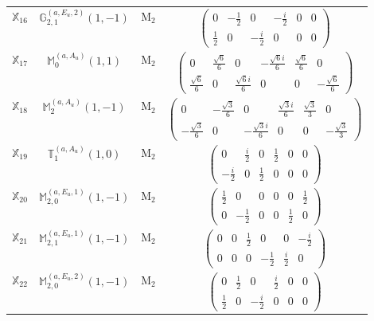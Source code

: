 \documentclass[fleqn,10pt,landscape]{article}
\begin{document}
\begin{itemize}
\begin{center}
\begin{longtable}{c|c|c|c}
$ \mathbb{X}_{16} $ & $\mathbb{G}_{2,1}^{(a,E_{u},2)}(1,-1)$ & M$_{2}$ & $\begin{pmatrix} 0 & - \frac{1}{2} & 0 & - \frac{i}{2} & 0 & 0 \\ \frac{1}{2} & 0 & - \frac{i}{2} & 0 & 0 & 0 \end{pmatrix}$ \\
$ \mathbb{X}_{17} $ & $\mathbb{M}_{0}^{(a,A_{u})}(1,1)$ & M$_{2}$ & $\begin{pmatrix} 0 & \frac{\sqrt{6}}{6} & 0 & - \frac{\sqrt{6} i}{6} & \frac{\sqrt{6}}{6} & 0 \\ \frac{\sqrt{6}}{6} & 0 & \frac{\sqrt{6} i}{6} & 0 & 0 & - \frac{\sqrt{6}}{6} \end{pmatrix}$ \\
$ \mathbb{X}_{18} $ & $\mathbb{M}_{2}^{(a,A_{u})}(1,-1)$ & M$_{2}$ & $\begin{pmatrix} 0 & - \frac{\sqrt{3}}{6} & 0 & \frac{\sqrt{3} i}{6} & \frac{\sqrt{3}}{3} & 0 \\ - \frac{\sqrt{3}}{6} & 0 & - \frac{\sqrt{3} i}{6} & 0 & 0 & - \frac{\sqrt{3}}{3} \end{pmatrix}$ \\
$ \mathbb{X}_{19} $ & $\mathbb{T}_{1}^{(a,A_{u})}(1,0)$ & M$_{2}$ & $\begin{pmatrix} 0 & \frac{i}{2} & 0 & \frac{1}{2} & 0 & 0 \\ - \frac{i}{2} & 0 & \frac{1}{2} & 0 & 0 & 0 \end{pmatrix}$ \\
$ \mathbb{X}_{20} $ & $\mathbb{M}_{2,0}^{(a,E_{u},1)}(1,-1)$ & M$_{2}$ & $\begin{pmatrix} \frac{1}{2} & 0 & 0 & 0 & 0 & \frac{1}{2} \\ 0 & - \frac{1}{2} & 0 & 0 & \frac{1}{2} & 0 \end{pmatrix}$ \\
$ \mathbb{X}_{21} $ & $\mathbb{M}_{2,1}^{(a,E_{u},1)}(1,-1)$ & M$_{2}$ & $\begin{pmatrix} 0 & 0 & \frac{1}{2} & 0 & 0 & - \frac{i}{2} \\ 0 & 0 & 0 & - \frac{1}{2} & \frac{i}{2} & 0 \end{pmatrix}$ \\
$ \mathbb{X}_{22} $ & $\mathbb{M}_{2,0}^{(a,E_{u},2)}(1,-1)$ & M$_{2}$ & $\begin{pmatrix} 0 & \frac{1}{2} & 0 & \frac{i}{2} & 0 & 0 \\ \frac{1}{2} & 0 & - \frac{i}{2} & 0 & 0 & 0 \end{pmatrix}$ \\

\end{longtable}
\end{center}
\end{itemize}
\end{document}
